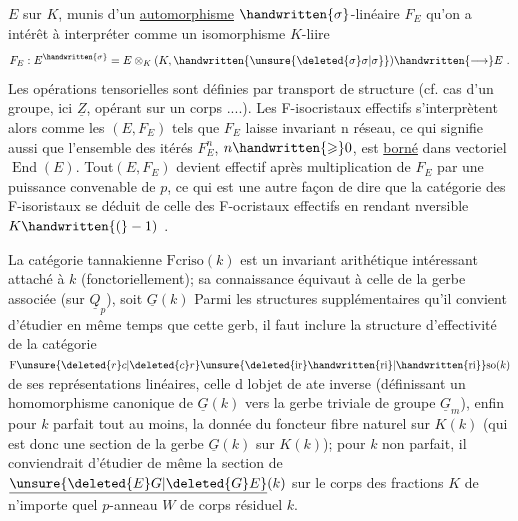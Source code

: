 
$E$ sur $K$, munis d'un  \uline{automorphisme} $\handwritten{\sigma}$-linéaire $F_E$\handwritten{;}  qu'on a intérêt à interpréter comme un isomorphisme $K$-liire
\[
F_E : E^{\handwritten{\sigma}} = E\otimes_K(K,\handwritten{\unsure{\deleted{\sigma}\sigma|\sigma}})\handwritten{\longrightarrow} E\ .
\]
Les opérations tensorielles sont définies par transport de structure (cf. cas d'un groupe, ici $\underline{Z}$, opérant sur un corps ....). Les F-isocristaux effectifs s'interprètent alors comme les $(E,F_E)$ tels que $F_E$ laisse invariant n réseau, ce qui signifie aussi que l'ensemble des itérés $F_E^n$, $n\handwritten{\geqslant}0$, est \uline{borné} dans  vectoriel $\operatorname{End}(E)$. Tout$(E,F_E)$ devient  effectif après multiplication de $F_E$ par une puissance convenable de $p$, ce qui est une autre façon de dire que la catégorie des F-isoristaux se déduit de celle des F-ocristaux effectifs  en rendant nversible $K\handwritten{(}-1)$ .

 La catégorie tannakienne $\mathrm{Fcriso}(k)$ est un invariant arithétique intéressant attaché à $k$ (fonctoriellement); sa  connaissance équivaut à celle de la gerbe associée (sur $\underline{Q}_p$), soit $\underline{G}(k)$ Parmi les structures supplémentaires qu'il convient d'étudier en même temps que cette gerb, il faut inclure la structure d'effectivité de la catégorie $\mathrm{F}\unsure{\deleted{r}c|\deleted{c}r}\unsure{\deleted{\mathrm{ir}}\handwritten{\mathrm{ri}}|\handwritten{\mathrm{ri}}}\mathrm{so}(k)$ de ses représentations linéaires, celle d lobjet de ate inverse (définissant un homomorphisme canonique de $\underline{G}(k)$ vers la gerbe triviale de groupe $\underline{G}_m$), enfin pour $k$ parfait tout au moins, la donnée du foncteur fibre naturel sur $K(k)$ (qui est donc une section de la gerbe $\underline{G}(k)$ sur $K(k)$); pour $k$ non parfait, il conviendrait  d'étudier de même la section de $\underline{\unsure{\deleted{E}G|\deleted{G}E}}(k)$ sur le corps des fractions $K$ de n'importe quel $p$-anneau $W$ de corps résiduel $k$.

